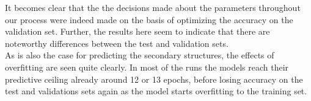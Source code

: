 \noindent It becomes clear that the the decisions made about the parameters throughout our process were indeed made on the basis of optimizing the accuracy on the validation set. Further, the results here seem to indicate that there are noteworthy differences between the test and validation sets.\\
As is also the case for predicting the secondary structures, the effects of overfitting are seen quite clearly. In most of the runs the models reach their predictive ceiling already around 12 or 13 epochs, before losing accuracy on the test and validations sets again as the model starts overfitting to the training set.

